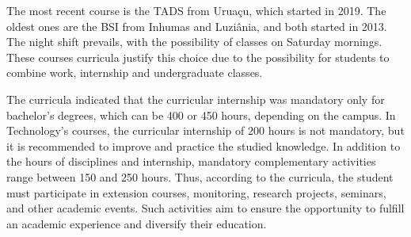 \documentclass[sigconf, review]{educomp}
\begin{document}
The most recent course is the TADS from Uruaçu, which started in 2019.
The oldest ones are the BSI from Inhumas and Luziânia, and both started in 2013.
The night shift prevails, with the possibility of classes on Saturday mornings.
These courses curricula justify this choice due to the possibility for students to combine work, internship and undergraduate classes.

The curricula indicated that the curricular internship was mandatory only for bachelor's degrees, which can be 400 or 450 hours, depending on the campus.
In Technology's courses, the curricular internship of 200 hours is not mandatory, but it is recommended to improve and practice the studied knowledge.
In addition to the hours of disciplines and internship, mandatory complementary activities range between 150 and 250 hours.
Thus, according to the curricula, the student must participate in extension courses, monitoring, research projects, seminars, and other academic events.
Such activities aim to ensure the opportunity to fulfill an academic experience and diversify their education.
\end{document}
